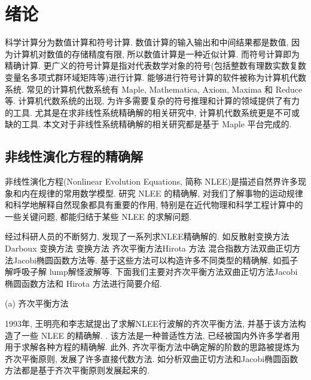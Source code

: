 \chapter{绪论} \label{ch01}
科学计算分为数值计算和符号计算. 数值计算的输入输出和中间结果都是数值, 因为计算机对数值的存储精度有限, 所以数值计算是一种近似计算. 而符号计算即为精确计算. 更广义的符号计算是指对代表数学对象的符号(包括整数\D 有理数\D 实数\D 复数\D 变量名\D 多项式\D 群\D 环\D 域\D 矩阵等)进行计算. 能够进行符号计算的软件被称为计算机代数系统. 常见的计算机代数系统有 Maple, Mathematica, Axiom, Maxima 和 Reduce 等. 计算机代数系统的出现, 为许多需要复杂的符号推理和计算的领域提供了有力的工具. 尤其是在求非线性系统精确解的相关研究中, 计算机代数系统更是不可或缺的工具. 本文对于非线性系统精确解的相关研究都是基于 Maple 平台完成的. 

\section{非线性演化方程的精确解}
非线性演化方程(Nonlinear Evolution Equations, 简称 NLEE)是描述自然界许多现象和内在规律的常用数学模型. 研究 NLEE 的精确解, 对我们了解事物的运动规律和科学地解释自然现象都具有重要的作用, 特别是在近代物理和科学工程计算中的一些关键问题, 都能归结于某些 NLEE 的求解问题. 

经过科研人员的不断努力, 发现了一系列求NLEE精确解的. 如反散射变换方法\cite{kawata1978inverse}\D Darboux 变换方法 \cite{matveev1991darboux}\D \Backlund{}变换方法 \cite{wahlquist1973backlund}\D 齐次平衡方法\cite{zhibin1993travelling}\D Hirota 方法 \cite{hirota1971exact}\D 混合指数方法\cite{hereman1986exact}\D 双曲正切方法\cite{malfliet1992solitary}\D Jacobi椭圆函数方法\cite{liu2001jacobi}等. 基于这些方法可以构造许多不同类型的精确解, 如孤子解\cite{hirota1971exact}\D 呼吸子解 \cite{tajiri1989breather}\D lump解\cite{satsuma1979two}\D 怪波解\cite{guo2011rogue}等. 下面我们主要对齐次平衡方法\D 双曲正切方法\D Jacobi 椭圆函数方法和 Hirota 方法进行简要介绍. 

(a) 齐次平衡方法

1993年, 王明亮和李志斌\cite{zhibin1993travelling}提出了求解NLEE行波解的齐次平衡方法, 并基于该方法构造了一些 NLEE 的精确解\cite{wang1995solitary,wang1996application}. . 该方法是一种普适性方法, 已经被国内外许多学者用用于求解各种方程的精确解\cite{hbm1998,senthilvelan2001extended,zhao2002new,rady2010homogeneous,nguyen2015modified}. 此外, 齐次平衡方法中确定解的阶数的思路被提炼为齐次平衡原则, 发展了许多直接代数方法. 如\Painleve{}分析\D 双曲正切方法和Jacobi椭圆函数方法都是基于齐次平衡原则发展起来的. 

